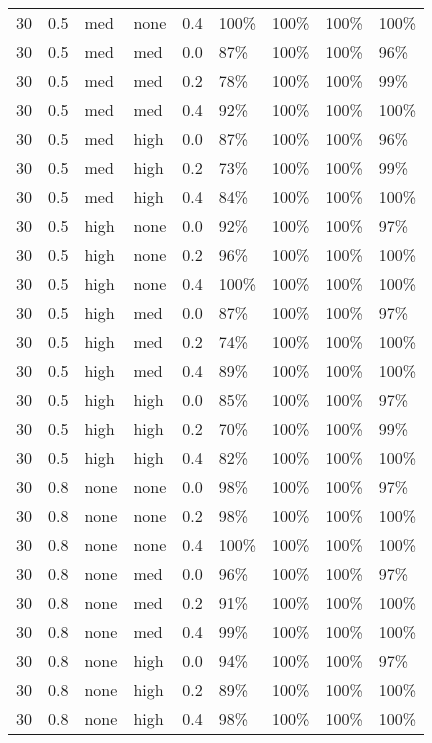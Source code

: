 \begin{longtable}{rrllrllll}
  30 & 0.5 & med & none & 0.4 & 100\% & 100\% & 100\% & 100\% \\ 
  30 & 0.5 & med & med & 0.0 & 87\% & 100\% & 100\% & 96\% \\ 
  30 & 0.5 & med & med & 0.2 & 78\% & 100\% & 100\% & 99\% \\ 
  30 & 0.5 & med & med & 0.4 & 92\% & 100\% & 100\% & 100\% \\ 
  30 & 0.5 & med & high & 0.0 & 87\% & 100\% & 100\% & 96\% \\ 
  30 & 0.5 & med & high & 0.2 & 73\% & 100\% & 100\% & 99\% \\ 
  30 & 0.5 & med & high & 0.4 & 84\% & 100\% & 100\% & 100\% \\ 
  30 & 0.5 & high & none & 0.0 & 92\% & 100\% & 100\% & 97\% \\ 
  30 & 0.5 & high & none & 0.2 & 96\% & 100\% & 100\% & 100\% \\ 
  30 & 0.5 & high & none & 0.4 & 100\% & 100\% & 100\% & 100\% \\ 
  30 & 0.5 & high & med & 0.0 & 87\% & 100\% & 100\% & 97\% \\ 
  30 & 0.5 & high & med & 0.2 & 74\% & 100\% & 100\% & 100\% \\ 
  30 & 0.5 & high & med & 0.4 & 89\% & 100\% & 100\% & 100\% \\ 
  30 & 0.5 & high & high & 0.0 & 85\% & 100\% & 100\% & 97\% \\ 
  30 & 0.5 & high & high & 0.2 & 70\% & 100\% & 100\% & 99\% \\ 
  30 & 0.5 & high & high & 0.4 & 82\% & 100\% & 100\% & 100\% \\ 
  30 & 0.8 & none & none & 0.0 & 98\% & 100\% & 100\% & 97\% \\ 
  30 & 0.8 & none & none & 0.2 & 98\% & 100\% & 100\% & 100\% \\ 
  30 & 0.8 & none & none & 0.4 & 100\% & 100\% & 100\% & 100\% \\ 
  30 & 0.8 & none & med & 0.0 & 96\% & 100\% & 100\% & 97\% \\ 
  30 & 0.8 & none & med & 0.2 & 91\% & 100\% & 100\% & 100\% \\ 
  30 & 0.8 & none & med & 0.4 & 99\% & 100\% & 100\% & 100\% \\ 
  30 & 0.8 & none & high & 0.0 & 94\% & 100\% & 100\% & 97\% \\ 
  30 & 0.8 & none & high & 0.2 & 89\% & 100\% & 100\% & 100\% \\ 
  30 & 0.8 & none & high & 0.4 & 98\% & 100\% & 100\% & 100\% \\ 

\end{longtable}
